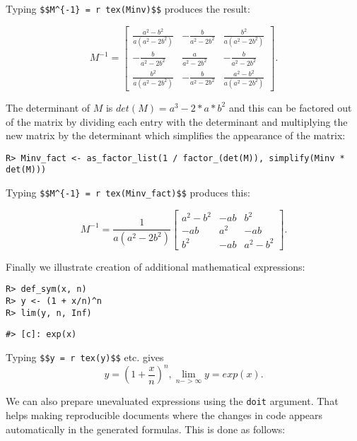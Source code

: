 Typing \texttt{\$\$M\^{}\{-1\}\ =\ \textasciigrave{}r\ tex(Minv)\textasciigrave{}\$\$}
produces the result:

\[
M^{-1} = \left[\begin{matrix}\frac{a^{2} - b^{2}}{a \left(a^{2} - 2 b^{2}\right)} & - \frac{b}{a^{2} - 2 b^{2}} & \frac{b^{2}}{a \left(a^{2} - 2 b^{2}\right)}\\- \frac{b}{a^{2} - 2 b^{2}} & \frac{a}{a^{2} - 2 b^{2}} & - \frac{b}{a^{2} - 2 b^{2}}\\\frac{b^{2}}{a \left(a^{2} - 2 b^{2}\right)} & - \frac{b}{a^{2} - 2 b^{2}} & \frac{a^{2} - b^{2}}{a \left(a^{2} - 2 b^{2}\right)}\end{matrix}\right] .
\]

The determinant of \(M\) is \(det(M)=a^3 - 2*a*b^2\) and this can be factored out of the matrix by dividing each entry with the determinant and multiplying the new matrix by the determinant which simplifies the appearance of the matrix:

\begin{verbatim}
R> Minv_fact <- as_factor_list(1 / factor_(det(M)), simplify(Minv * det(M)))
\end{verbatim}

Typing \texttt{\$\$M\^{}\{-1\}\ =\ \textasciigrave{}r\ tex(Minv\_fact)\textasciigrave{}\$\$} produces this:

\[
M^{-1} = \frac{1}{a \left(a^{2} - 2 b^{2}\right)}  \left[\begin{matrix}a^{2} - b^{2} & - a b & b^{2}\\- a b & a^{2} & - a b\\b^{2} & - a b & a^{2} - b^{2}\end{matrix}\right].
\]

Finally we illustrate creation of additional mathematical expressions:

\begin{verbatim}
R> def_sym(x, n)
R> y <- (1 + x/n)^n
R> lim(y, n, Inf)
\end{verbatim}

\begin{verbatim}
#> [c]: exp(x)
\end{verbatim}

Typing \texttt{\$\$y\ =\ \textasciigrave{}r\ tex(y)\textasciigrave{}\$\$} etc. gives
\[
y = \left(1 + \frac{x}{n}\right)^{n}, \lim_{n->\infty} y = exp(x) .
\]

We can also prepare unevaluated expressions using the \texttt{doit}
argument. That helps making reproducible documents where the changes
in code appears automatically in the generated formulas.
This is done as follows:

